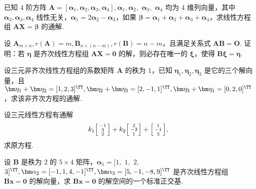 	\begin{titwo}
		已知 $4$ 阶方阵 $\bm A = [\bm \alpha_{1},\bm \alpha_{2},\bm \alpha_{3},\bm \alpha_{4}],\bm \alpha_{1},\bm \alpha_{2},$ $\bm \alpha_{3},$ $\bm \alpha_{4}$ 均为 $4$ 维列向量，其中 $\bm \alpha_{2},\bm \alpha_{3},\bm \alpha_{4}$ 线性无关，$\bm \alpha_{1} = 2\bm \alpha_{2} - \bm \alpha_{3}$，如果 $\bm \beta = \bm \alpha_{1} + \bm \alpha_{2} + \bm \alpha_{3} + \bm \alpha_{4}$，求线性方程组 $\bm A \bm X = \bm \beta$ 的通解.
	\end{titwo}

	\begin{titwo}
		设 $\bm A_{m \times n}, r(\bm A) = m, \bm B_{n \times (n - m)}, r(\bm B) = n - m$，且满足关系式 $\bm A \bm B = \bm O$. 证明：若 $\bm \eta$ 是齐次线性方程组 $\bm A \bm X = \bm 0$ 的解，则必存在唯一的 $\bm \xi$，使得 $\bm B \bm \xi = \bm \eta$.
	\end{titwo}

	\begin{titwo}
		设三元非齐次线性方程组的系数矩阵 $\bm A$ 的秩为 $1$，已知 $\bm \eta_{1},\bm \eta_{2},\bm \eta_{3}$ 是它的三个解向量，且 $\bm \eta_{1} + \bm \eta_{2} = [1,2,3]^{\TT},\bm \eta_{2} + \bm \eta_{3} = [2,-1,1]^{\TT},\bm \eta_{3} + \bm \eta_{1} = [0,2,0]^{\TT}$，求该非齐次方程的通解.
	\end{titwo}

	\begin{titwo}
		设三元线性方程有通解
		\[
			k_{1} \begin{bsmallmatrix}
				-1\\
				3\\
				2
			\end{bsmallmatrix} + k_{2} \begin{bsmallmatrix}
				2\\
				-3\\
				1
			\end{bsmallmatrix} + \begin{bsmallmatrix}
				1\\
				-1\\
				3
			\end{bsmallmatrix},
		\]
		求原方程.
	\end{titwo}

	\begin{titwo}
		设 $\bm B$ 是秩为 $2$ 的 $5 \times 4$ 矩阵，$\bm \alpha_{1} = [1,$ $1,$ $2,$ $3]^{\TT}, \bm \alpha_{2} = [-1,1,4,-1]^{\TT}, \bm \alpha_{3} = [5,-1,-8,9]^{\TT}$ 是齐次线性方程组 $\bm B \bm x = \bm 0$ 的解向量，求 $\bm B \bm x = \bm 0$ 的解空间的一个标准正交基.
	\end{titwo}

